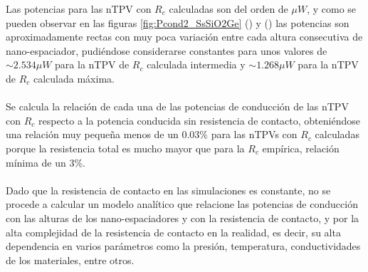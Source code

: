Las potencias para las nTPV con $R_c$ calculadas son del orden de $\mu W$, y como se pueden observar en las figuras \ref{fig:Pcond2_SsSiO2Ge} () y () las potencias son aproximadamente rectas con muy poca variación entre cada altura consecutiva de nano-espaciador, pudiéndose considerarse constantes para unos valores de $\sim 2.534 \mu W$ para la nTPV de $R_c$ calculada intermedia y $\sim 1.268 \mu W$ para la nTPV de $R_c$ calculada máxima.\\\\
Se calcula la relación de cada una de las potencias de conducción de las nTPV con $R_c$ respecto a la potencia conducida sin resistencia de contacto, obteniéndose una relación muy pequeña menos de un 0.03\% para las nTPVs con $R_c$ calculadas porque la resistencia total es mucho mayor que para la $R_c$ empírica, relación mínima de un 3\%.\\\\
Dado que la resistencia de contacto en las simulaciones es constante, no se procede a calcular un modelo analítico que relacione las potencias de conducción con las alturas de los nano-espaciadores y con la resistencia de contacto, y por la alta complejidad de la resistencia de contacto en la realidad, es decir, su alta dependencia en varios parámetros como la presión, temperatura, conductividades de los materiales, entre otros.
